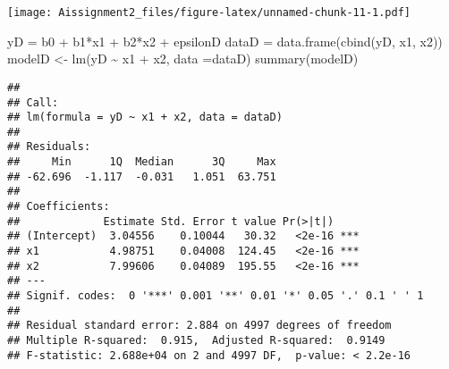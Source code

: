 \documentclass[
]{article}
\newenvironment{Shaded}{\begin{snugshade}}{\end{snugshade}}
\newcommand{\AttributeTok}[1]{\textcolor[rgb]{0.77,0.63,0.00}{#1}}
\newcommand{\CommentTok}[1]{\textcolor[rgb]{0.56,0.35,0.01}{\textit{#1}}}
\newcommand{\DecValTok}[1]{\textcolor[rgb]{0.00,0.00,0.81}{#1}}
\newcommand{\FunctionTok}[1]{\textcolor[rgb]{0.00,0.00,0.00}{#1}}
\newcommand{\NormalTok}[1]{#1}
\newcommand{\OtherTok}[1]{\textcolor[rgb]{0.56,0.35,0.01}{#1}}
\newcommand{\SpecialCharTok}[1]{\textcolor[rgb]{0.00,0.00,0.00}{#1}}
\begin{document}
\texttt{[image: Aissignment2\_files/figure-latex/unnamed-chunk-11-1.pdf]}

\begin{Shaded}
\begin{Highlighting}[]
\NormalTok{yD }\OtherTok{=}\NormalTok{ b0 }\SpecialCharTok{+}\NormalTok{ b1}\SpecialCharTok{*}\NormalTok{x1 }\SpecialCharTok{+}\NormalTok{ b2}\SpecialCharTok{*}\NormalTok{x2 }\SpecialCharTok{+}\NormalTok{ epsilonD}
\NormalTok{dataD }\OtherTok{=} \FunctionTok{data.frame}\NormalTok{(}\FunctionTok{cbind}\NormalTok{(yD, x1, x2))}
\NormalTok{modelD }\OtherTok{\textless{}{-}} \FunctionTok{lm}\NormalTok{(yD }\SpecialCharTok{\textasciitilde{}}\NormalTok{ x1 }\SpecialCharTok{+}\NormalTok{ x2, }\AttributeTok{data =}\NormalTok{dataD)}
\FunctionTok{summary}\NormalTok{(modelD)}
\end{Highlighting}
\end{Shaded}

\begin{verbatim}
## 
## Call:
## lm(formula = yD ~ x1 + x2, data = dataD)
## 
## Residuals:
##     Min      1Q  Median      3Q     Max 
## -62.696  -1.117  -0.031   1.051  63.751 
## 
## Coefficients:
##             Estimate Std. Error t value Pr(>|t|)    
## (Intercept)  3.04556    0.10044   30.32   <2e-16 ***
## x1           4.98751    0.04008  124.45   <2e-16 ***
## x2           7.99606    0.04089  195.55   <2e-16 ***
## ---
## Signif. codes:  0 '***' 0.001 '**' 0.01 '*' 0.05 '.' 0.1 ' ' 1
## 
## Residual standard error: 2.884 on 4997 degrees of freedom
## Multiple R-squared:  0.915,  Adjusted R-squared:  0.9149 
## F-statistic: 2.688e+04 on 2 and 4997 DF,  p-value: < 2.2e-16
\end{verbatim}

\begin{Shaded}
\end{Shaded}
\end{document}
